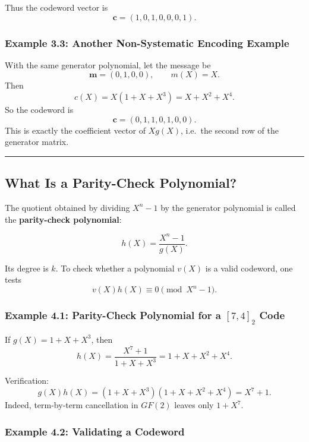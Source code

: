\documentclass[
]{article}
\begin{document}
Thus the codeword vector is \[\mathbf{c}=(1,0,1,0,0,0,1).\]

\subsubsection{Example 3.3: Another Non-Systematic Encoding
Example}\label{example-3.3-another-non-systematic-encoding-example}

With the same generator polynomial, let the message be
\[\mathbf{m}=(0,1,0,0), \qquad m(X)=X.\] Then
\[c(X)=X(1+X+X^3)=X+X^2+X^4.\] So the codeword is
\[\mathbf{c}=(0,1,1,0,1,0,0).\] This is exactly the coefficient vector
of \(Xg(X)\), i.e.~the second row of the generator matrix.

\begin{center}\rule{0.5\linewidth}{0.5pt}\end{center}

\subsection{What Is a Parity-Check
Polynomial?}\label{what-is-a-parity-check-polynomial}

The quotient obtained by dividing \(X^n-1\) by the generator polynomial
is called the \textbf{parity-check polynomial}:

\[h(X)=\frac{X^n-1}{g(X)}.\]

Its degree is \(k\). To check whether a polynomial \(v(X)\) is a valid
codeword, one tests \[v(X)h(X) \equiv 0 \pmod{X^n-1}.\]

\subsubsection{\texorpdfstring{Example 4.1: Parity-Check Polynomial for
a \([7,4]_2\)
Code}{Example 4.1: Parity-Check Polynomial for a {[}7,4{]}\_2 Code}}\label{example-4.1-parity-check-polynomial-for-a-74_2-code}

If \(g(X)=1+X+X^3\), then \[h(X)=\frac{X^7+1}{1+X+X^3}=1+X+X^2+X^4.\]

Verification: \[g(X)h(X)=(1+X+X^3)(1+X+X^2+X^4)=X^7+1.\] Indeed,
term-by-term cancellation in \(GF(2)\) leaves only \(1+X^7\).

\subsubsection{Example 4.2: Validating a
Codeword}\label{example-4.2-validating-a-codeword}
\end{document}
